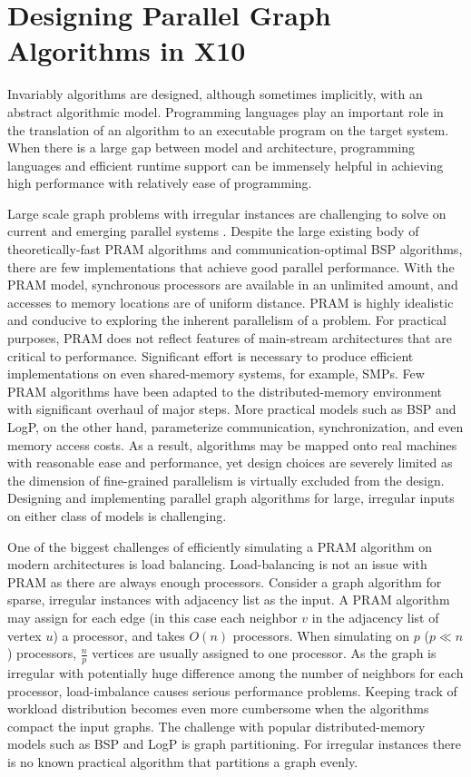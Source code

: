
\section{Designing Parallel Graph Algorithms in X10}
\label{s:design}

 Invariably algorithms are designed, although sometimes implicitly, with an abstract algorithmic model. Programming languages play an important role in the translation of an algorithm to an executable program on the target system. When there is a large gap between model and architecture, programming languages and efficient runtime support can be immensely helpful in achieving high performance with relatively ease of programming. 

 Large scale graph problems with irregular instances are challenging to solve on current and emerging parallel systems \cite{BC07}. Despite the large existing body of theoretically-fast PRAM algorithms and communication-optimal BSP algorithms, there are few implementations that achieve good parallel performance. With the PRAM model, synchronous processors are available in an unlimited amount, and accesses to memory locations are of uniform distance. PRAM is highly idealistic and conducive to exploring the inherent parallelism of a problem. For practical purposes, PRAM does not reflect features of main-stream architectures that are critical to performance. Significant effort is necessary to produce efficient implementations on even shared-memory systems, for example, SMPs. Few PRAM algorithms have been adapted to the distributed-memory environment with significant overhaul of major steps. More practical models such as BSP and LogP, on the other hand, parameterize communication, synchronization, and even memory access costs. As a result, algorithms may be mapped onto real machines with reasonable ease and performance, yet design choices are severely limited as the dimension of fine-grained parallelism is virtually excluded from the design. Designing and implementing parallel graph algorithms for large, irregular inputs on either class of models is challenging. 

 One of the biggest challenges of efficiently simulating a PRAM algorithm on modern architectures is load balancing. Load-balancing is not an issue with PRAM as there are always enough processors. Consider a graph algorithm for sparse, irregular instances with adjacency list as the input. A PRAM algorithm may assign for each edge (in this case each neighbor $v$ in the adjacency list of vertex $u$) a processor, and takes $O(n)$ processors. When simulating on $p$ ($p\ll n$) processors, $\frac{n}{p}$ vertices are usually assigned to one processor. As the graph is irregular with potentially huge difference among the number of neighbors for each processor, load-imbalance causes serious performance problems. Keeping track of workload distribution becomes even more cumbersome when the algorithms compact the input graphs. The challenge with popular distributed-memory models such as BSP and LogP is graph partitioning. For irregular instances there is no known practical algorithm that partitions a graph evenly.  

